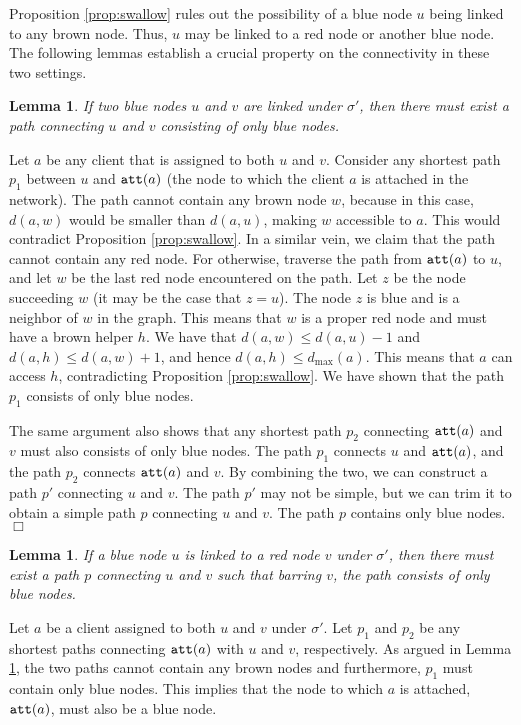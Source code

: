\documentclass[11pt]{article}
\newtheorem{lemma}[theorem]{Lemma}
\newcommand{\att} {{\tt att}}
\newcommand{\dmax} {d_{\max}}
\newcommand{\qed} {\hfill$\Box$}
\begin{document}

Proposition \ref{prop:swallow} rules out the possibility of a blue node $u$ being linked to any brown node.
Thus, $u$ may be linked to a red node or another blue node. 
The following lemmas establish a crucial property on the connectivity in these two settings.

\begin{lemma}
\label{lem:link1}
If two blue nodes $u$ and $v$ are linked under $\sigma'$,
then there must exist a path connecting $u$ and $v$ consisting of only blue nodes. 
\end{lemma}
\proof
Let $a$ be any client that is assigned to both $u$ and $v$.
Consider any shortest path $p_1$ between $u$ and $\att(a)$ (the node to which the client $a$ is attached in the network).
The path cannot contain any brown node $w$, because in this case, $d(a, w)$ would be smaller than
$d(a, u)$, making $w$ accessible to $a$. This would contradict Proposition \ref{prop:swallow}.
In a similar vein, we claim that the path cannot contain any red node.
For otherwise, traverse the path from $\att(a)$ to $u$, and let $w$ be the last red node encountered on the path.
Let $z$ be the node succeeding $w$ (it may be the case that $z=u$).
The node $z$ is blue and is a neighbor of $w$ in the graph. 
This means that $w$ is a proper red node and must have a brown helper $h$. 
We have that $d(a, w) \leq d(a, u) -1$ and $d(a, h) \leq d(a, w)+1$,
and hence $d(a, h)\leq \dmax(a)$.
This means that $a$ can access $h$, contradicting Proposition \ref{prop:swallow}.
We have shown that the path $p_1$ consists of only blue nodes. 

The same argument also shows that any shortest path $p_2$ connecting $\att(a)$ and $v$ must also consists of only blue nodes. 
The path $p_1$ connects $u$ and $\att(a)$, and the path $p_2$ connects $\att(a)$ and $v$.
By combining the two, we can construct a path $p'$ connecting $u$ and $v$.
The path $p'$ may not be simple, but we can trim it to obtain a simple path $p$ connecting $u$ and $v$.
The path $p$ contains only blue nodes. 
\qed

\begin{lemma}
\label{lem:link2}
If a blue node $u$ is linked to a red node $v$ under $\sigma'$,
then there must exist a path $p$ connecting $u$ and $v$ such that barring $v$, the path consists of only blue nodes. 
\end{lemma}
\proof
Let $a$ be a client assigned to both $u$ and $v$ under $\sigma'$.
Let $p_1$ and $p_2$ be any shortest paths connecting $\att(a)$ with $u$ and $v$, respectively.
As argued in Lemma \ref{lem:link1}, the two paths cannot contain any brown nodes
and furthermore, $p_1$ must contain only blue nodes. 
This implies that the node to which $a$ is attached, $\att(a)$, must also be a blue node.
\end{document}
